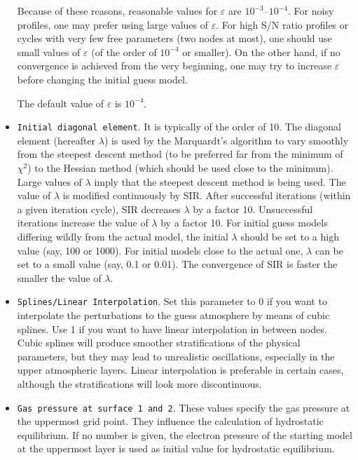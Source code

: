 \begin{itemize}
Because of these reasons, reasonable values for $\varepsilon$ are
$10^{-3}$--$10^{-4}$.  For noisy profiles, one may prefer using large
values of $\varepsilon$. For high S/N ratio profiles or cycles with
very few free parameters (two nodes at most), one should use small
values of $\varepsilon$ (of the order of $10^{-4}$ or smaller). On the
other hand, if no convergence is achieved from the very beginning, one 
may try to increase $\varepsilon$ before changing the initial guess model. 

The default value of $\varepsilon$ is $10^{-4}$. 
 
\item {\tt Initial diagonal element}. It is typically of the order of
10. The diagonal element (hereafter $\lambda$) is used by the
Marquardt's algorithm to vary smoothly from the steepest descent method
(to be preferred far from the minimum of $\chi^2$) to the Hessian
method (which should be used close to the minimum). Large values of $\lambda$ 
imply that the steepest descent method is being used. The value of $\lambda$ 
is modified continuously by SIR. After successful iterations (within a given 
iteration cycle), SIR decreases $\lambda$ by a factor 10. Unsuccessful 
iterations increase the value of $\lambda$ by a factor 10. For initial
guess models differing wildly from the actual model, the initial $\lambda$
should be set to a high value (say, 100 or 1000). For initial models close
to the actual one, $\lambda$ can be set to a small value (say, 0.1 or 0.01). 
The convergence of SIR is faster the smaller the value of $\lambda$. 

\item {\tt Splines/Linear Interpolation}. Set this parameter to 0 if you 
want to interpolate the perturbations to the guess atmosphere by means
of cubic splines. Use 1 if you want to have linear interpolation in 
between nodes. Cubic splines will produce smoother stratifications of
the physical parameters, but they may lead to unrealistic oscillations,
especially in the upper atmospheric layers. Linear interpolation is
preferable in certain cases, although the stratifications will look 
more discontinuous.

\item {\tt Gas pressure at surface 1 and 2}. These values specify 
the gas pressure at the uppermost grid point. They influence 
the calculation of hydrostatic equilibrium. If no number is given, 
the electron pressure of the starting model at the uppermost layer 
is used as initial value for hydrostatic equilibrium.

\end{itemize}  

